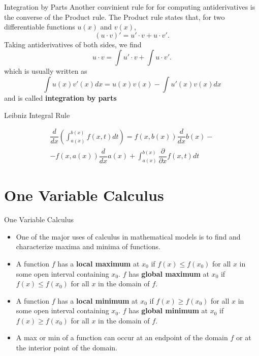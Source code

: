 \documentclass{beamer}
\begin{document}
\begin{frame}{Integration by Parts}
    Another convinient rule for for computing antiderivatives is the converse of the Product rule. The Product rule states that, for two differentiable functions $u(x)$ and $v(x)$, 
    \[(u\cdot v)'=u'\cdot v+u \cdot v'. 
    \]
    Taking antiderivatives of both sides, we find 
    \[u\cdot v=\int u'\cdot v+\int u \cdot v'. 
    \]
    which is usually written as 
    \[\int u(x) v'(x)dx=u(x)v(x)- \int u'(x)v(x) dx
    \] and is called \textbf{integration by parts}
\end{frame}

\begin{frame}{ Leibniz Integral Rule}
    \begin{block}{ }
    \begin{align*}
        \dfrac{d}{dx}\left( \int_{a(x)}^{b(x)} f(x,t)dt\right)= f(x, b(x))\dfrac{d}{dx}b(x)-\\- f(x, a(x))\dfrac{d}{dx}a(x)+ \int_{a(x)}^{b(x)} \dfrac{\partial }{\partial x}f(x,t)dt
    \end{align*}
    \end{block}
\end{frame}

\section{One Variable Calculus}

\begin{frame}{One Variable Calculus}
    \begin{itemize}
        \item One of the major uses of calculus in mathematical models is to find and characterize maxima and minima of functions. 
        \item A function $f$ has a \textbf{local maximum} at $x_0$ if $f(x)\leq f(x_0)$ for all $x$ in some open interval containing $x_0$. $f$ has \textbf{global maximum} at $x_0$ if $f(x)\leq f(x_0)$ for all $x$ in the domain of $f$. 
        \item A function $f$ has a \textbf{local minimum} at $x_0$ if $f(x)\geq f(x_0)$ for all $x$ in some open interval containing $x_0$. $f$ has \textbf{global minimum} at $x_0$ if $f(x)\geq f(x_0)$ for all $x$ in the domain of $f$. 
        \item A max or min of a function can occur at an endpoint of the domain $f$ or at the interior point of the domain.
        
    \end{itemize}
    \end{frame}
\end{document}
